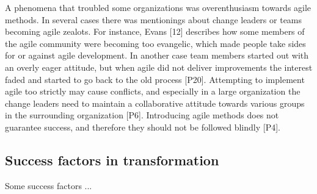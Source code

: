 \documentclass[preprint,authoryear,12pt]{elsarticle}
\begin{document}

A phenomena that troubled some organizations was overenthusiasm towards agile
methods. In several cases there was mentionings about change leaders or teams
becoming agile zealots. For instance, Evans [12] describes how some members of
the agile community were becoming too evangelic, which made people take sides
for or against agile development. In another case team members started out with
an overly eager attitude, but when agile did not deliver improvements the
interest faded and started to go back to the old process [P20]. Attempting to
implement agile too strictly may cause conflicts, and especially in a large
organization the change leaders need to maintain a collaborative attitude
towards various groups in the surrounding organization [P6]. Introducing agile
methods does not guarantee success, and therefore they should not be followed
blindly [P4].






\clearpage

\subsection{Success factors in transformation}

Some success factors ...









\end{document}

